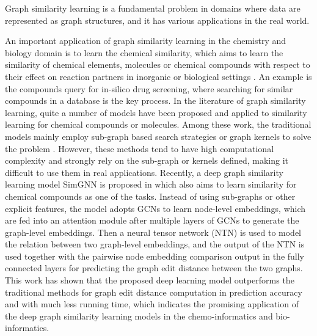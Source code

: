 \label{sec:apps}
Graph similarity learning is a fundamental problem in domains where data are represented as graph structures, and it has various applications in the real world.

An important application of graph similarity learning in the chemistry and biology domain is to learn the chemical similarity, which aims to learn the similarity of chemical elements, molecules or chemical compounds with respect to their effect on reaction partners in inorganic or biological settings . An example is the compounds query for in-silico drug screening, where searching for similar compounds in a database is the key process. 
In the literature of graph similarity learning, quite a number of models have been proposed and applied to similarity learning for chemical compounds or molecules. Among these work, the traditional models mainly employ sub-graph based search strategies or graph kernels to solve the problem . However, these methods tend to have high computational complexity and strongly rely on the sub-graph or kernels defined, making it difficult to use them in real applications. Recently, a deep graph similarity learning model SimGNN is proposed in  which also aims to learn similarity for chemical compounds as one of the tasks. Instead of using sub-graphs or other explicit features, the model adopts GCNs to learn node-level embeddings, which are fed into an attention module after multiple layers of GCNs to generate the graph-level embeddings. Then a neural tensor network (NTN)  is used to model the relation between two graph-level embeddings, and the output of the NTN is used together with the pairwise node embedding comparison output in the fully connected layers for predicting the graph edit distance between the two graphs. This work has shown that the proposed deep learning model outperforms the traditional methods for graph edit distance computation in prediction accuracy and with much less running time, which indicates the promising application of the deep graph similarity learning models in the chemo-informatics and bio-informatics.


